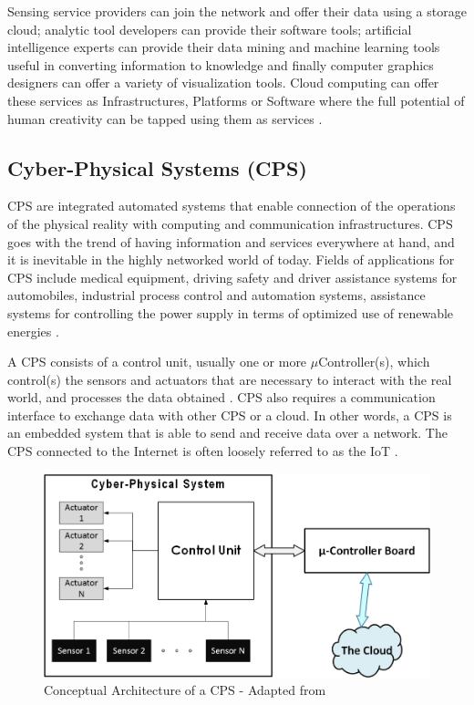 Sensing service providers can join the network and offer their data using a storage cloud; analytic tool developers can provide their software tools; artificial intelligence experts can provide their data mining and machine learning tools useful in converting information to knowledge and finally computer graphics designers can offer a variety of visualization tools. Cloud computing can offer these services as Infrastructures, Platforms or Software where the full potential of human creativity can be tapped using them as services \cite{IOTGUBBI}. 

\subsection{Cyber-Physical Systems (CPS)} \label{CPS}
\acs{CPS} are integrated automated systems that enable connection of the operations of the physical reality with computing and communication infrastructures. \acs{CPS} goes with the trend of having information and services everywhere at hand, and it is inevitable in the highly networked world of today. Fields of applications for \acs{CPS} include medical equipment, driving safety and driver assistance systems for automobiles, industrial process control and automation systems, assistance systems for controlling the power supply in terms of optimized use of renewable energies   \cite{CYBERIN,IN4DESIGN}. 

A \acs{CPS} consists of a control unit, usually one or more $\mu$Controller(s), which control(s) the sensors and actuators that are necessary to interact with the real world, and processes the data obtained . \acs{CPS} also requires a communication interface to exchange data with other \acs{CPS} or a cloud. In other words, a \acs{CPS} is an embedded system that is able to send and receive data over a network. The \acs{CPS} connected to the Internet is often loosely referred to as the \acs{IoT} \cite{CYBERIN}. 
\begin{figure}[h!]
	\includegraphics[scale=0.5]{./gfx/cpsdiag}
	\centering
	\caption{Conceptual Architecture of a \acs{CPS} - Adapted from \cite{CYBERIN}}
	\label{fig:2.9}
\end{figure}

